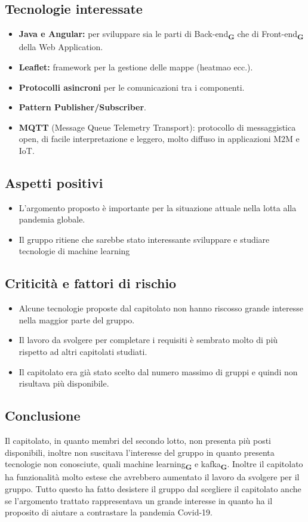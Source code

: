 \subsection{Tecnologie interessate}
\begin{itemize}
    \item \textbf{Java e Angular:} per sviluppare sia le parti di Back-end\textsubscript{\textbf{G}} che di Front-end\textsubscript{\textbf{G}} della Web Application.
    \item \textbf{Leaflet:} framework per la gestione delle mappe (heatmao ecc.).
    \item \textbf{Protocolli asincroni} per le comunicazioni tra i componenti.
    \item \textbf{Pattern Publisher/Subscriber}.
    \item \textbf{MQTT} (Message Queue Telemetry Transport): protocollo di messaggistica open, di facile interpretazione e leggero, molto diffuso in applicazioni M2M e IoT.
\end{itemize}

\subsection{Aspetti positivi}
\begin{itemize}
    \item L'argomento proposto è importante per la situazione attuale nella lotta alla pandemia globale.
    \item Il gruppo ritiene che sarebbe stato interessante sviluppare e studiare tecnologie di machine learning
\end{itemize}

\subsection{Criticità e fattori di rischio}
\begin{itemize}
    \item Alcune tecnologie proposte dal capitolato non hanno riscosso grande interesse nella maggior parte del gruppo.
    \item Il lavoro da svolgere per completare i requisiti è sembrato molto di più rispetto ad altri capitolati studiati.
    \item Il capitolato era già stato scelto dal numero massimo di gruppi e quindi non risultava più disponibile.
\end{itemize}
\subsection{Conclusione}
Il capitolato, in quanto membri del secondo lotto, non presenta più posti disponibili, inoltre non suscitava l'interesse del gruppo in quanto presenta tecnologie non conosciute, 
quali machine learning\textsubscript{\textbf{G}} e kafka\textsubscript{\textbf{G}}. Inoltre il capitolato ha funzionalità molto estese che avrebbero aumentato il lavoro da svolgere per il gruppo. Tutto questo ha fatto desistere il gruppo dal scegliere il capitolato 
anche se l'argomento trattato rappresentava un grande interesse in quanto ha il proposito di aiutare a contrastare la pandemia Covid-19.